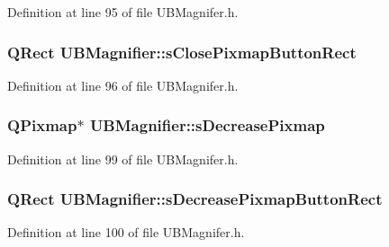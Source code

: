 Definition at line 95 of file U\-B\-Magnifer.\-h.

\hypertarget{class_u_b_magnifier_ac399c3c6a70e36926484c154b2ed9aec}{
\subsubsection[{s\-Close\-Pixmap\-Button\-Rect}]{\setlength{\rightskip}{0pt plus 5cm}Q\-Rect U\-B\-Magnifier\-::s\-Close\-Pixmap\-Button\-Rect\hspace{0.3cm}{\ttfamily [protected]}}}\label{d4/d9d/class_u_b_magnifier_ac399c3c6a70e36926484c154b2ed9aec}


Definition at line 96 of file U\-B\-Magnifer.\-h.

\hypertarget{class_u_b_magnifier_a4f359c0b0f611b1baad359ba65a9d37e}{
\subsubsection[{s\-Decrease\-Pixmap}]{\setlength{\rightskip}{0pt plus 5cm}Q\-Pixmap$\ast$ U\-B\-Magnifier\-::s\-Decrease\-Pixmap\hspace{0.3cm}{\ttfamily [protected]}}}\label{d4/d9d/class_u_b_magnifier_a4f359c0b0f611b1baad359ba65a9d37e}


Definition at line 99 of file U\-B\-Magnifer.\-h.

\hypertarget{class_u_b_magnifier_a057d572621c65843b5fb29c0a07d3da4}{
\subsubsection[{s\-Decrease\-Pixmap\-Button\-Rect}]{\setlength{\rightskip}{0pt plus 5cm}Q\-Rect U\-B\-Magnifier\-::s\-Decrease\-Pixmap\-Button\-Rect\hspace{0.3cm}{\ttfamily [protected]}}}\label{d4/d9d/class_u_b_magnifier_a057d572621c65843b5fb29c0a07d3da4}


Definition at line 100 of file U\-B\-Magnifer.\-h.

